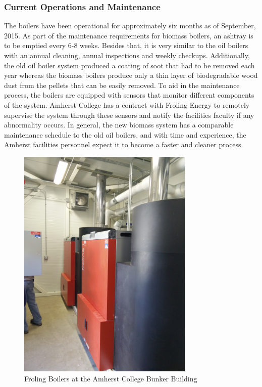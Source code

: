 \subsubsection{Current Operations and Maintenance}
\par The boilers have been operational for approximately six months as of September, 2015. As part of the maintenance requirements for biomass boilers, an ashtray is to be emptied every 6-8 weeks. Besides that, it is very similar to the oil boilers with an annual cleaning, annual inspections and weekly checkups. Additionally, the old oil boiler system produced a coating of soot that had to be removed each year whereas the biomass boilers produce only a thin layer of biodegradable wood dust from the pellets that can be easily removed. To aid in the maintenance process, the boilers are equipped with sensors that monitor different components of the system. Amherst College has a contract with Froling Energy to remotely supervise the system through these sensors and notify the facilities faculty if any abnormality occurs. In general, the new biomass system has a comparable maintenance schedule to the old oil boilers, and with time and experience, the Amherst facilities personnel expect it to become a faster and cleaner process.
\begin{figure}[H]
\centering
\includegraphics[width=0.75\textwidth]{findingschapter/amherstboilers}
\caption{Froling Boilers at the Amherst College Bunker Building}
\end{figure}

